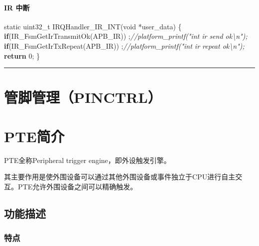 \documentclass[
  12pt,
]{book}
\newenvironment{Shaded}{\begin{snugshade}}{\end{snugshade}}
\newcommand{\CommentTok}[1]{\textcolor[rgb]{0.56,0.35,0.01}{\textit{#1}}}
\newcommand{\ControlFlowTok}[1]{\textcolor[rgb]{0.13,0.29,0.53}{\textbf{#1}}}
\newcommand{\DataTypeTok}[1]{\textcolor[rgb]{0.13,0.29,0.53}{#1}}
\newcommand{\DecValTok}[1]{\textcolor[rgb]{0.00,0.00,0.81}{#1}}
\newcommand{\NormalTok}[1]{#1}
\begin{document}
\hypertarget{ir-ux4e2dux65ad}{%
\subsubsection{IR 中断}\label{ir-ux4e2dux65ad}}

\begin{Shaded}
\begin{Highlighting}[]
\DataTypeTok{static} \DataTypeTok{uint32_t}\NormalTok{ IRQHandler_IR_INT(}\DataTypeTok{void}\NormalTok{ *user_data)}
\NormalTok{\{}
    \ControlFlowTok{if}\NormalTok{(IR_FsmGetIrTransmitOk(APB_IR))}
\NormalTok{        ;}\CommentTok{//platform_printf("int ir send ok\textbackslash{}n");}
    \ControlFlowTok{if}\NormalTok{(IR_FsmGetIrTxRepeat(APB_IR))}
\NormalTok{        ;}\CommentTok{//platform_printf("int ir repeat ok\textbackslash{}n");}
    \ControlFlowTok{return} \DecValTok{0}\NormalTok{;}
\NormalTok{\}}
\end{Highlighting}
\end{Shaded}

\begin{center}\rule{0.5\linewidth}{0.5pt}\end{center}

\hypertarget{ch-pinctrl}{%
\chapter{管脚管理（PINCTRL）}\label{ch-pinctrl}}

\hypertarget{pteux7b80ux4ecb}{%
\chapter{PTE简介}\label{pteux7b80ux4ecb}}

PTE全称Peripheral trigger engine，即外设触发引擎。

其主要作用是使外围设备可以通过其他外围设备或事件独立于CPU进行自主交互。PTE允许外围设备之间可以精确触发。

\hypertarget{ux529fux80fdux63cfux8ff0-1}{%
\section{功能描述}\label{ux529fux80fdux63cfux8ff0-1}}

\hypertarget{ux7279ux70b9-1}{%
\subsection{特点}\label{ux7279ux70b9-1}}
\end{document}
